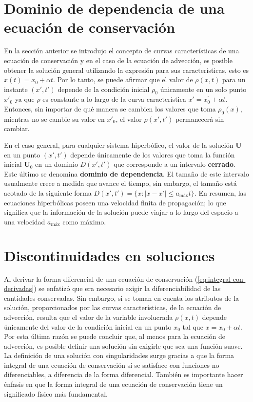 \section{Dominio de dependencia de una ecuación de conservación}
En la sección anterior se introdujo el concepto de curvas características de una ecuación de conservación y en el caso de la ecuación de advección, es posible obtener la solución general utilizando la expresión para sus características, esto es $x(t) = x_0 + \alpha t$. Por lo tanto, se puede afirmar que el valor de $\rho(x,t)$ para un instante $(x',t')$ depende de la condición inicial $\rho_0$ únicamente en un solo punto $x'_{0}$ ya que $\rho$ es constante a lo largo de la curva característica $x' = x^{'}_{0} + \alpha t$. Entonces, sin importar de qué manera se cambien los valores que toma $\rho_0(x)$, mientras no se cambie su valor en $x'_0$, el valor $\rho(x',t')$ permanecerá sin cambiar. 

En el caso general, para cualquier sistema hiperbólico, el valor de la solución $\mathbf{U}$ en un punto $(x',t')$ depende únicamente de los valores que toma la función inicial $\mathbf{U}_0$ en un dominio $D(x',t')$ que corresponde a un intervalo \textbf{cerrado}. Este último se denomina \textbf{dominio de dependencia}. El tamaño de este intervalo usualmente crece a medida que avance el tiempo, sin embargo, el tamaño está acotado de la siguiente forma $D(x',t') = \{x : |x-x'| \leq a_{\text{máx}}t \}$. En resumen, las ecuaciones hiperbólicas poseen una velocidad finita de propagación; lo que significa que la información de la solución puede viajar a lo largo del espacio a una velocidad $a_{\text{máx}}$ como máximo.

\section{Discontinuidades en soluciones}
Al derivar la forma diferencial de una ecuación de conservación (\ref{eq:integral-con-derivadas}) se enfatizó que era necesario exigir la diferenciabilidad de las cantidades conservadas. Sin embargo, si se toman en cuenta los atributos de la solución, proporcionados por las curvas características, de la ecuación de advección, resulta que el valor de la variable involucrada $\rho(x,t)$ depende únicamente del valor de la condición inicial en un punto $x_0$ tal que $x = x_0 + \alpha t$. Por esta última razón se puede concluir que, al menos para la ecuación de advección, es posible definir una solución sin exigirle que sea una función  suave. La definición de una solución con singularidades surge gracias a que la forma integral de una ecuación de conservación sí se satisface con funciones no diferenciables, a diferencia de la forma diferencial. También es importante hacer énfasis en que la forma integral de una ecuación de conservación tiene un significado físico más fundamental.

